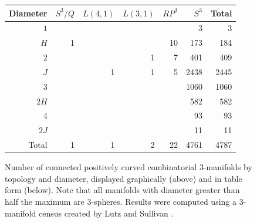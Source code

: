 \documentclass[12pt]{article}
\theoremstyle{plain}
\theoremstyle{definition}
\theoremstyle{remark}
\begin{document}
\begin{figure}
    \begin{center}
    {
	    \setlength\fboxsep{15pt}
		\setlength\fboxrule{0pt}
    }
    	\renewcommand{\arraystretch}{1.2}
    \begin{tabular} {| r | r | r | r | r | r | r |}
		\hline
		Diameter & $S^{3}/Q$ & $L(4,1)$ & $L(3,1)$ & $RP^{3}$ & $S^{3}$ & Total \\
		\hline
		\hline
		$1$&  &  &  &   &3    & 3    \\
		$H$&1 &  &  &10 &173  & 184  \\
		$2$&  &  &1 &7  &401  & 409  \\
		$J$&  &1 &1 &5  &2438 & 2445 \\
		$3$&  &  &  &   &1060 & 1060 \\
		$2H$&  &  &  &   &582  & 582  \\
		$4$&  &  &  &   &93   & 93   \\
		$2J$&  &  &  &   &11   & 11   \\
		\hline
		Total&1 &1 &2 &22   &4761   &4787  \\
		\hline
	\end{tabular}
    \end{center}
    \caption{Number of connected positively curved combinatorial 3-manifolds by topology and diameter, displayed graphically (above) and in table form (below). Note that all manifolds with diameter greater than half the maximum are 3-spheres. Results were computed using a 3-manifold census created by Lutz and Sullivan \cite{LutzSul_unpub}.}
    \label{fig:type_statistics}
\end{figure}
\end{document}
